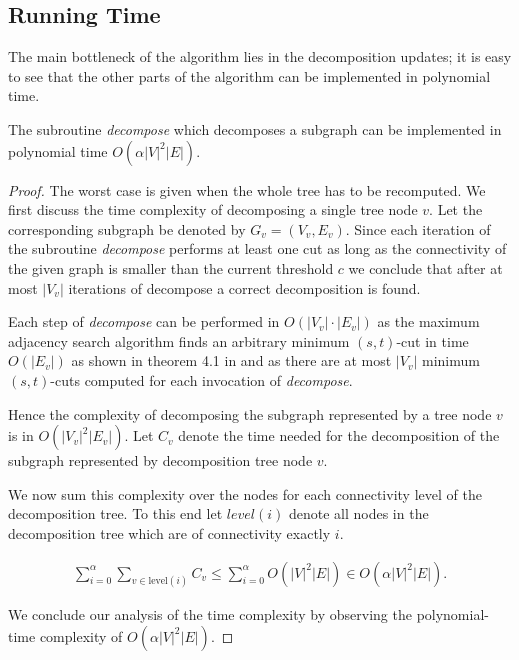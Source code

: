 \documentclass[a4paper,UKenglish,cleveref, autoref, thm-restate,authorcolumns]{lipics-v2019}
\newcommand{\adjDel}{\textsc{pCrep}}
\begin{document}
\subsection{Running Time}
\label{run_time_sec}

The main bottleneck of the algorithm lies in the decomposition updates;
it is easy to see that 
the other parts of the algorithm can be implemented in polynomial time.

\begin{lemma}
	\label{dec_run_time_lem}
	The subroutine \textit{decompose} which decomposes a subgraph can be implemented in polynomial time $O(\alpha|V|^2|E|)$.
\end{lemma}

\begin{proof}
	The worst case is given when the whole tree has to be recomputed. We first discuss the time complexity of decomposing a single tree node $v$. Let the corresponding subgraph be denoted by $G_v=(V_v, E_v)$.
	Since each iteration of the subroutine \textit{decompose} performs at least one cut as long as the connectivity of the given graph is smaller than the current threshold $c$ we conclude that after at most $|V_v|$ iterations of decompose a correct decomposition is found. 
	
	Each step of \textit{decompose} can be performed in $O(|V_v|\cdot|E_v|)$ as the maximum adjacency search algorithm finds an arbitrary minimum $(s,t)$-cut in time $O(|E_v|)$ as shown in theorem 4.1 in \cite{Chang2013} and as there are at most $|V_v|$ minimum $(s,t)$-cuts computed for each invocation of \textit{decompose}.
	
	Hence the complexity of decomposing the subgraph represented by a tree node $v$ is in $O(|V_v|^2|E_v|)$. Let $C_v$ denote the time needed for the decomposition of the subgraph represented  by decomposition tree node $v$.
	
	We now sum this complexity over the nodes for each connectivity level of the decomposition tree. To this end let $level(i)$ denote all nodes in the decomposition tree which are of connectivity exactly $i$.
	
	\begin{align*}
	\sum_{i=0}^{\alpha}\sum_{v\in \text{level}(i)}C_v\leq\sum_{i=0}^{\alpha}O(|V|^2|E|)\in O(\alpha|V|^2|E|).
	\end{align*}
	
	We conclude our analysis of the time complexity by observing the polynomial-time complexity of $O(\alpha|V|^2|E|)$.
\end{proof}
\end{document}
